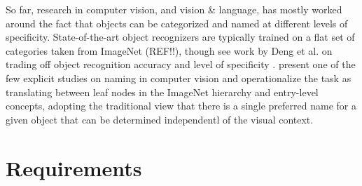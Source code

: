 \documentclass[runningheads]{llncs}
\begin{document}
So far, research in computer vision, and vision \& language, has mostly worked around the fact that objects can be categorized and named at different levels of specificity.
 State-of-the-art object recognizers are typically trained on a flat set of categories taken from ImageNet (REF!!), though see work by Deng et al. on trading off object recognition accuracy and level of specificity \cite{deng2012hedging}.
\cite{Ordonez:2016} present one of the few explicit studies on naming in computer vision and operationalize the task as translating between leaf nodes in the ImageNet hierarchy and entry-level
 concepts, adopting the traditional view that there is a single preferred name for a given object that can be determined independentl of the visual context.

\section{Requirements}
\label{sec:requirements}
\end{document}
